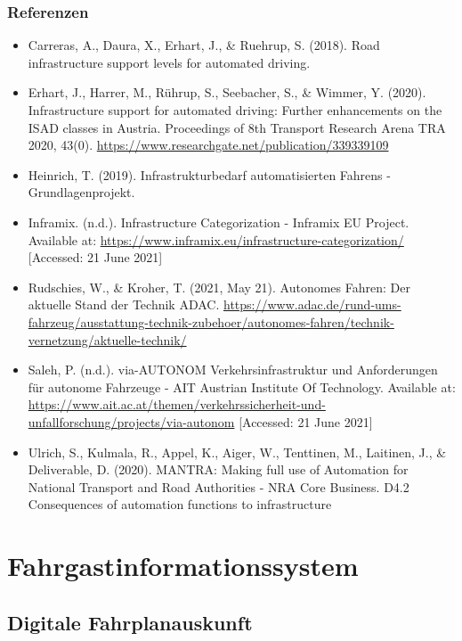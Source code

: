\documentclass[
]{book}
\providecommand{\tightlist}{%
  \setlength{\itemsep}{0pt}\setlength{\parskip}{0pt}}
\begin{document}
\hypertarget{referenzen-19}{%
\subsection*{Referenzen}\label{referenzen-19}}

\begin{itemize}
\tightlist
\item
  Carreras, A., Daura, X., Erhart, J., \& Ruehrup, S. (2018). Road infrastructure support levels for automated driving.
\item
  Erhart, J., Harrer, M., Rührup, S., Seebacher, S., \& Wimmer, Y. (2020). Infrastructure support for automated driving: Further enhancements on the ISAD classes in Austria. Proceedings of 8th Transport Research Arena TRA 2020, 43(0). \url{https://www.researchgate.net/publication/339339109}
\item
  Heinrich, T. (2019). Infrastrukturbedarf automatisierten Fahrens - Grundlagenprojekt.
\item
  Inframix. (n.d.). Infrastructure Categorization - Inframix EU Project. Available at: \url{https://www.inframix.eu/infrastructure-categorization/} {[}Accessed: 21 June 2021{]}
\item
  Rudschies, W., \& Kroher, T. (2021, May 21). Autonomes Fahren: Der aktuelle Stand der Technik \textbar{} ADAC. \url{https://www.adac.de/rund-ums-fahrzeug/ausstattung-technik-zubehoer/autonomes-fahren/technik-vernetzung/aktuelle-technik/}
\item
  Saleh, P. (n.d.). via-AUTONOM Verkehrsinfrastruktur und Anforderungen für autonome Fahrzeuge - AIT Austrian Institute Of Technology. Available at: \url{https://www.ait.ac.at/themen/verkehrssicherheit-und-unfallforschung/projects/via-autonom} {[}Accessed: 21 June 2021{]}
\item
  Ulrich, S., Kulmala, R., Appel, K., Aiger, W., Tenttinen, M., Laitinen, J., \& Deliverable, D. (2020). MANTRA: Making full use of Automation for National Transport and Road Authorities - NRA Core Business. D4.2 Consequences of automation functions to infrastructure
\end{itemize}

\hypertarget{passenger}{%
\chapter{Fahrgastinformationssystem}\label{passenger}}

\hypertarget{djp}{%
\section{Digitale Fahrplanauskunft}\label{djp}}
\end{document}
